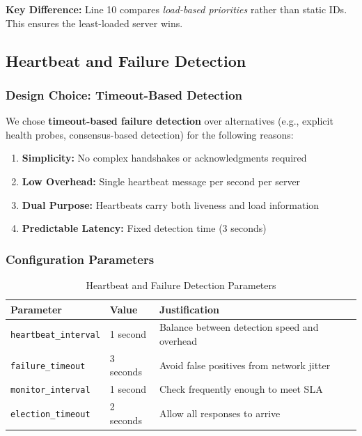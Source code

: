 \documentclass[12pt,a4paper]{article}
\begin{document}
\textbf{Key Difference:} Line 10 compares \emph{load-based priorities} rather than static IDs. This ensures the least-loaded server wins.

\subsection{Heartbeat and Failure Detection}

\subsubsection{Design Choice: Timeout-Based Detection}

We chose \textbf{timeout-based failure detection} over alternatives (e.g., explicit health probes, consensus-based detection) for the following reasons:

\begin{enumerate}
    \item \textbf{Simplicity:} No complex handshakes or acknowledgments required
    \item \textbf{Low Overhead:} Single heartbeat message per second per server
    \item \textbf{Dual Purpose:} Heartbeats carry both liveness and load information
    \item \textbf{Predictable Latency:} Fixed detection time (3 seconds)
\end{enumerate}

\subsubsection{Configuration Parameters}

\begin{table}[h]
\centering
\caption{Heartbeat and Failure Detection Parameters}
\label{tab:heartbeat-params}
\begin{tabular}{@{}lll@{}}
\toprule
\textbf{Parameter} & \textbf{Value} & \textbf{Justification} \\
\midrule
\texttt{heartbeat\_interval} & 1 second & Balance between detection speed and overhead \\
\texttt{failure\_timeout} & 3 seconds & Avoid false positives from network jitter \\
\texttt{monitor\_interval} & 1 second & Check frequently enough to meet SLA \\
\texttt{election\_timeout} & 2 seconds & Allow all responses to arrive \\
\bottomrule
\end{tabular}
\end{table}
\end{document}
